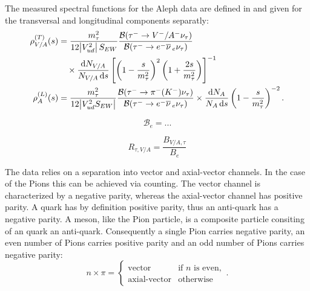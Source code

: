 \documentclass[../../index.tex]{subfiles}
\begin{document}
The measured spectral functions for the Aleph data are defined in
\cite{Davier2007} and given for the transversal and longitudinal components separatly:
\begin{equation}
  \begin{split}
    \rho^{(T)}_{V/A}(s) &= \frac{m_\tau^2}{12 \abs{V_{ud}^2}S_{EW}} \frac{\mathcal{B}(\tau^- \to V^-/A^- \nu_\tau)}{\mathcal{B}(\tau^- \to e^- \anti{\nu}_e \nu_\tau)} \\
    &\quad\times \frac{\dif N_{V/A}}{N_{V/A}\dif s} \left[ \left( 1 - \frac{s}{m_\tau^2} \right)^2 \left( 1 + \frac{2s}{m_\tau^2} \right) \right]^{-1} \\
  \rho^{(L)}_{A}(s) &= \frac{m_\tau^2}{12 \abs{V_{ud}^2 S_{EW}}} \frac{\mathcal{B}(\tau^- \to \pi^-(K^-) \nu_\tau)}{\mathcal{B}(\tau^- \to e^- \anti{\nu}_e \nu_\tau)} \times \frac{\dif N_A}{N_A \dif s} \left( 1 - \frac{s}{m_\tau^2} \right)^{-2}.
  \end{split}
\end{equation}

\begin{equation}
  \mathcal{B}_e = ...
\end{equation}

\begin{equation}
  R_{\tau, V/A} = \frac{B_{V/A, \tau}}{B_e}
\end{equation}

The data relies on a separation into vector and axial-vector channels. In the
case of the Pions this can be achieved via counting. The vector channel is
characterized by a negative parity, whereas the axial-vector channel has
positive parity. A quark has by definition positive parity, thus an anti-quark
has a negative parity. A meson, like the Pion particle, is a composite particle
consiting of an quark an anti-quark. Consequently a single Pion carries negative
parity, an even number of Pions carries positive parity and an odd number of
Pions carries negative parity:
\begin{equation}
  n \times \pi = \begin{cases} \mbox{vector} & \mbox{if } n \text{ is even}, \\ \mbox{axial-vector} & \mbox{otherwise} \end{cases}.
\end{equation}
\end{document}
